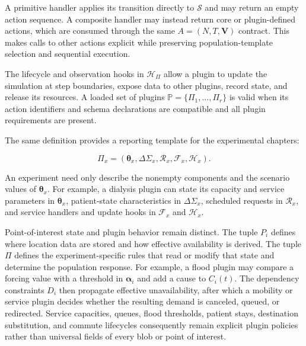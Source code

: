 A primitive handler applies its transition directly to $\mathcal{S}$ and may return an empty action sequence. A composite handler may instead return core or plugin-defined actions, which are consumed through the same $A=(N,T,\bm{V})$ contract. This makes calls to other actions explicit while preserving population-template selection and sequential execution.

The lifecycle and observation hooks in $\mathcal{H}_{\Pi}$ allow a plugin to update the simulation at step boundaries, expose data to other plugins, record state, and release its resources. 
A loaded set of plugins $\mathbb{P}=\{\Pi_1,\ldots,\Pi_r\}$ is valid when its action identifiers and schema declarations are compatible and all plugin requirements are present.

The same definition provides a reporting template for the experimental chapters:

\begin{equation}
\Pi_x=(\bm{\theta}_x,\Delta\Sigma_x,\mathcal{R}_x,
\mathcal{F}_x,\mathcal{H}_x).
\label{eq:experiment_plugin_template}
\end{equation}

An experiment need only describe the nonempty components and the scenario values of $\bm{\theta}_x$. For example, a dialysis plugin can state its capacity and service parameters in $\bm{\theta}_x$, patient-state characteristics in $\Delta\Sigma_x$, scheduled requests in $\mathcal{R}_x$, and service handlers and update hooks in $\mathcal{F}_x$ and $\mathcal{H}_x$.

Point-of-interest state and plugin behavior remain distinct. The tuple $P_i$ defines where location data are stored and how effective availability is derived. The tuple $\Pi$ defines the experiment-specific rules that read or modify that state and determine the population response. 
For example, a flood plugin may compare a forcing value with a threshold in $\bm{\alpha}_i$ and add a cause to $C_i(t)$. The dependency constraints $D_i$ then propagate effective unavailability, after which a mobility or service plugin decides whether the resulting demand is canceled, queued, or redirected. Service capacities, queues, flood thresholds, patient stays, destination substitution, and commute lifecycles consequently remain explicit plugin policies rather than universal fields of every blob or point of interest.

